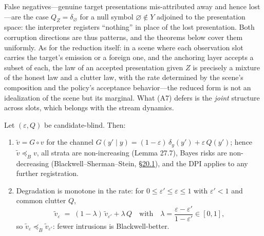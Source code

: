 \begin{thmrem}

False negatives---\hspace{0pt}genuine target presentations mis-attributed away and hence lost---\hspace{0pt}are the case \(Q_Z = \delta_{\varnothing}\) for a null symbol \(\varnothing \notin Y\) adjoined to the presentation space: the interpreter registers ``nothing'' in place of the lost presentation. Both corruption directions are thus patterns, and the theorems below cover them uniformly. As for the reduction itself: in a scene where each observation slot carries the target's emission or a foreign one, and the anchoring layer accepts a subset of each, the law of an accepted presentation given \(Z\) is precisely a mixture of the honest law and a clutter law, with the rate determined by the scene's composition and the policy's acceptance behavior---\hspace{0pt}the reduced form is not an idealization of the scene but its marginal. What (A7) defers is the \emph{joint} structure across slots, which belongs with the stream dynamics.
\end{thmrem}


\begin{thmplain}

Let \((\varepsilon, Q)\) be candidate-blind. Then:

\begin{enumerate}
\def\labelenumi{\arabic{enumi}.}
\tightlist
\item
  \(\tilde v = G \circ v\) for the channel \(G(y' \mid y) = (1 - \varepsilon)\, \delta_y(y') + \varepsilon\, Q(y')\); hence \(\tilde v \preceq_B v\), all strata are non-increasing (Lemma 27.7), Bayes risks are non-decreasing (Blackwell--Sherman--Stein, \hyperlink{sec:20.1}{§20.1}), and the DPI applies to any further registration.
\item
  Degradation is monotone in the rate: for \(0 \le \varepsilon' \le \varepsilon \le 1\) with \(\varepsilon' < 1\) and common clutter \(Q\),
  \[
  \tilde v_{\varepsilon} \;=\; (1 - \lambda)\, \tilde v_{\varepsilon'} + \lambda\, Q
  \quad\text{with}\quad
  \lambda = \frac{\varepsilon - \varepsilon'}{1 - \varepsilon'} \in [0, 1],
  \]
  so \(\tilde v_{\varepsilon} \preceq_B \tilde v_{\varepsilon'}\): fewer intrusions is Blackwell-better.
\end{enumerate}
\end{thmplain}


